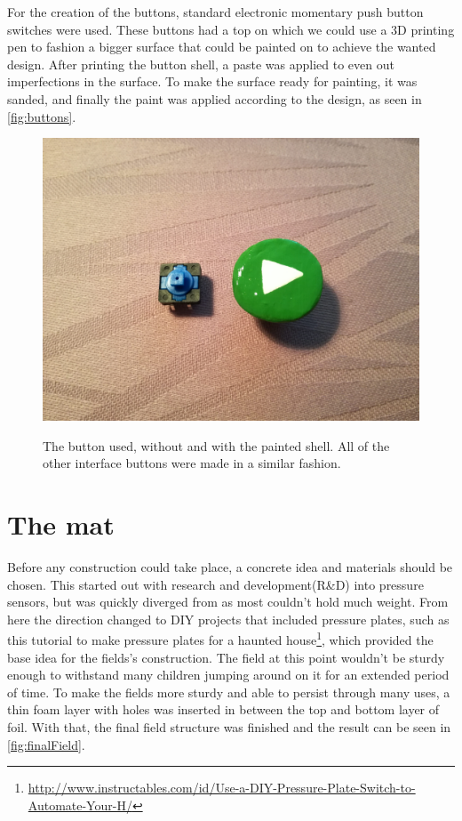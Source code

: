 	For the creation of the buttons, standard electronic momentary push button switches were used. These buttons had a top on which we could use a 3D printing pen to fashion a bigger surface that could be painted on to achieve the wanted design. After printing the button shell, a paste was applied to even out imperfections in the surface. To make the surface ready for painting, it was sanded, and finally the paint was applied according to the design, as seen in \autoref{fig:buttons}.
	\begin{figure}[H]
		\centering
		\includegraphics[width=0.7\linewidth]{figure/Design/buttons}
		\label{fig:buttons}
		\caption{The button used, without and with the painted shell. All of the other interface buttons were made in a similar fashion.}
	\end{figure}
		
\section{The mat}\label{sec:theMat}%
	Before any construction could take place, a concrete idea and materials should be chosen. This started out with research and development(R\&D) into pressure sensors, but was quickly diverged from as most couldn't hold much weight. From here the direction changed to DIY projects that included pressure plates, such as this tutorial to make pressure plates for a haunted house\footnote{\url{http://www.instructables.com/id/Use-a-DIY-Pressure-Plate-Switch-to-Automate-Your-H/}}, which provided the base idea for the fields's construction. The field at this point wouldn't be sturdy enough to withstand many children jumping around on it for an extended period of time. To make the fields more sturdy and able to persist through many uses, a thin foam layer with holes was inserted in between the top and bottom layer of foil. With that, the final field structure was finished and the result can be seen in \autoref{fig:finalField}.\\
	
